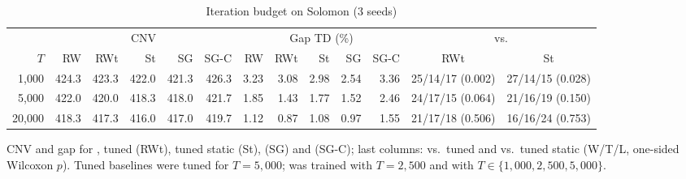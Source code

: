\begin{table}[t]
\centering
\caption{Iteration budget on Solomon (3 seeds)}\label{tab:budget2}
\setlength{\tabcolsep}{1.6pt}\scriptsize
\begin{adjustbox}{max width=\linewidth}
\begin{tabular}{rrrrrrrrrrrcc}
\toprule
& \multicolumn{5}{c}{CNV} & \multicolumn{5}{c}{Gap TD (\%)} & \multicolumn{2}{c}{\sgalns{} vs.}\\ \cmidrule(lr){2-6}\cmidrule(lr){7-11}\cmidrule(lr){12-13} $T$ & RW & RWt & St & SG & SG-C & RW & RWt & St & SG & SG-C & RWt & St\\ \midrule
1,000 & 424.3 & 423.3 & 422.0 & 421.3 & 426.3 & 3.23 & 3.08 & 2.98 & 2.54 & 3.36 & 25/14/17 (0.002) & 27/14/15 (0.028)\\
5,000 & 422.0 & 420.0 & 418.3 & 418.0 & 421.7 & 1.85 & 1.43 & 1.77 & 1.52 & 2.46 & 24/17/15 (0.064) & 21/16/19 (0.150)\\
20,000 & 418.3 & 417.3 & 416.0 & 417.0 & 419.7 & 1.12 & 0.87 & 1.08 & 0.97 & 1.55 & 21/17/18 (0.506) & 16/16/24 (0.753)\\
\bottomrule
\end{tabular}
\end{adjustbox}
\par\vspace{2pt}\parbox{\linewidth}{\footnotesize CNV and gap for \Rw{}, tuned \Rw{} (RWt), tuned static (St), \sgalns{} (SG) and \sgc{} (SG-C); last columns: \sgalns{} vs.\ tuned \Rw{} and vs.\ tuned static (W/T/L, one-sided Wilcoxon $p$). Tuned baselines were tuned for $T=5{,}000$; \sgalns{} was trained with $T=2{,}500$ and \sgc{} with $T\in\{1{,}000,2{,}500,5{,}000\}$.}
\end{table}
